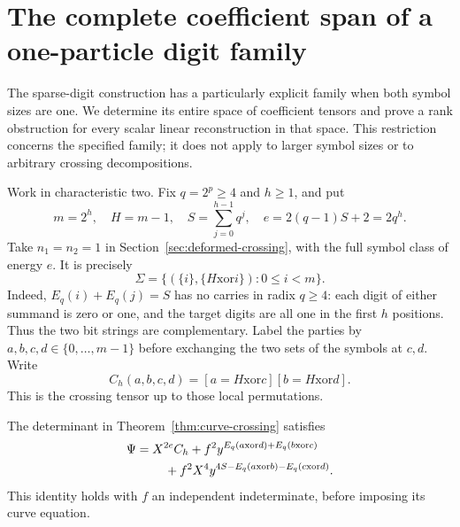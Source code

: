 \section{The complete coefficient span of a one-particle digit family}
\label{sec:one-particle-digits}

The sparse-digit construction has a particularly explicit family
when both symbol sizes are one. We determine its entire space of
coefficient tensors and prove a rank obstruction for every scalar
linear reconstruction in that space. This restriction concerns the
specified family; it does not apply to larger symbol sizes or to
arbitrary crossing decompositions.

Work in characteristic two. Fix $q=2^p\ge4$ and $h\ge1$, and put
\[
 m=2^h,\quad H=m-1,\quad
 S=\sum_{j=0}^{h-1}q^j,\quad e=2(q-1)S+2=2q^h.
\]
Take $n_1=n_2=1$ in Section~\ref{sec:deformed-crossing}, with the
full symbol class of energy $e$. It is precisely
\[
 \Sigma=\{(\{i\},\{H\mathbin{\mathrm{xor}}i\}):0\le i<m\}.
\]
Indeed, $E_q(i)+E_q(j)=S$ has no carries in radix $q\ge4$:
each digit of either summand is zero or one, and the target digits
are all one in the first $h$ positions. Thus the two bit strings
are complementary. Label the parties by $a,b,c,d\in\{0,\ldots,m-1\}$
before exchanging the two sets of the symbols at $c,d$.
Write
\[
 C_h(a,b,c,d)=[a=H\mathbin{\mathrm{xor}}c]
                         [b=H\mathbin{\mathrm{xor}}d].
\]
This is the crossing tensor up to those local permutations.

\begin{proposition}
\label{prop:one-particle-formula}
The determinant in Theorem~\ref{thm:curve-crossing} satisfies
\begin{align}
 \Psi={}&X^{2e}C_h
   +f^2y^{E_q(a\mathbin{\mathrm{xor}}d)+
                    E_q(b\mathbin{\mathrm{xor}}c)}\notag\\
 &\quad+f^2X^4y^{4S-E_q(a\mathbin{\mathrm{xor}}b)-
                           E_q(c\mathbin{\mathrm{xor}}d)}.
 \label{eq:one-particle-formula}
\end{align}
This identity holds with $f$ an independent indeterminate,
before imposing its curve equation.
\end{proposition}

